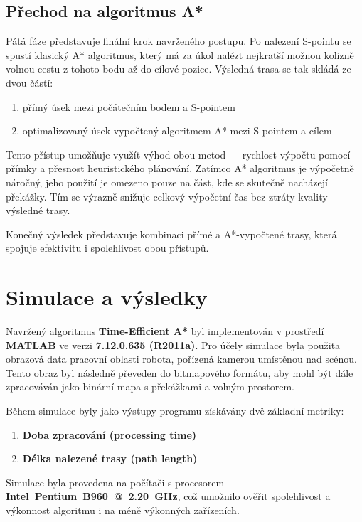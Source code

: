 \documentclass[10pt, a4paper]{article}
\begin{document}
\newpage
\subsection{Přechod na algoritmus A*}
Pátá fáze představuje finální krok navrženého postupu.
Po nalezení S-pointu se spustí klasický A* algoritmus, který má za úkol nalézt nejkratší možnou kolizně volnou cestu z tohoto bodu až do cílové pozice.
Výsledná trasa se tak skládá ze dvou částí:
\begin{enumerate}
    \item
    přímý úsek mezi počátečním bodem a S-pointem
    \item
    optimalizovaný úsek vypočtený algoritmem A* mezi S-pointem a cílem
\end{enumerate}

Tento přístup umožňuje využít výhod obou metod — rychlost výpočtu pomocí přímky a přesnost heuristického plánování.
Zatímco A* algoritmus je výpočetně náročný, jeho použití je omezeno pouze na část, kde se skutečně nacházejí překážky.
Tím se výrazně snižuje celkový výpočetní čas bez ztráty kvality výsledné trasy.

Konečný výsledek představuje kombinaci přímé a A*-vypočtené trasy, která spojuje efektivitu i spolehlivost obou přístupů.

\section{Simulace a výsledky}

Navržený algoritmus \textbf{Time-Efficient A*} byl implementován v prostředí \newline\textbf{MATLAB} ve verzi \textbf{7.12.0.635 (R2011a)}.
Pro účely simulace byla použita obrazová data pracovní oblasti robota, pořízená kamerou umístěnou nad scénou.
Tento obraz byl následně převeden do bitmapového formátu, aby mohl být dále zpracováván jako binární mapa s překážkami a volným prostorem.

Během simulace byly jako výstupy programu získávány dvě základní metriky:
\begin{enumerate}
    \item \textbf{Doba zpracování (processing time)}
    \item \textbf{Délka nalezené trasy (path length)}
\end{enumerate}

Simulace byla provedena na počítači s procesorem \newline\textbf{Intel~Pentium~B960~@~2.20~GHz}, což umožnilo ověřit spolehlivost a výkonnost algoritmu i na méně výkonných zařízeních.
\end{document}
